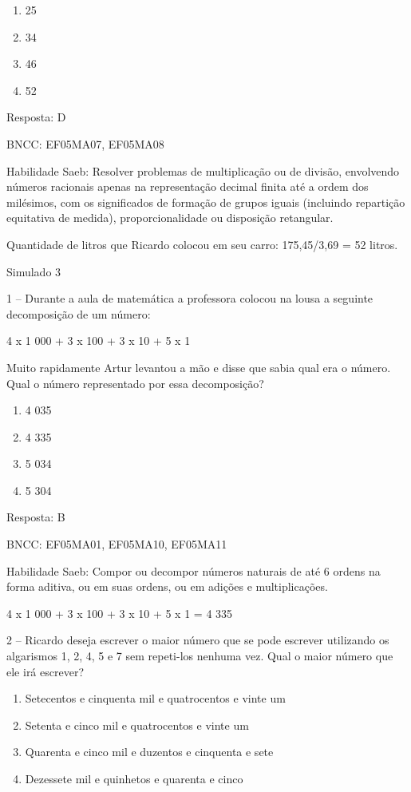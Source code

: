 \begin{enumerate}
\def\labelenumi{\alph{enumi})}
\item
  25
\item
  34
\item
  46
\item
  52
\end{enumerate}

Resposta: D

BNCC: EF05MA07, EF05MA08

Habilidade Saeb: Resolver problemas de multiplicação ou de divisão,
envolvendo números racionais apenas na representação decimal finita até
a ordem dos milésimos, com os significados de formação de grupos iguais
(incluindo repartição equitativa de medida), proporcionalidade ou
disposição retangular.

Quantidade de litros que Ricardo colocou em seu carro: 175,45/3,69 = 52
litros.

Simulado 3

1 -- Durante a aula de matemática a professora colocou na lousa a
seguinte decomposição de um número:

4 x 1 000 + 3 x 100 + 3 x 10 + 5 x 1

Muito rapidamente Artur levantou a mão e disse que sabia qual era o
número. Qual o número representado por essa decomposição?

\begin{enumerate}
\def\labelenumi{\alph{enumi})}
\item
  4 035
\item
  4 335
\item
  5 034
\item
  5 304
\end{enumerate}

Resposta: B

BNCC: EF05MA01, EF05MA10, EF05MA11

Habilidade Saeb: Compor ou decompor números naturais de até 6 ordens na
forma aditiva, ou em suas ordens, ou em adições e multiplicações.

4 x 1 000 + 3 x 100 + 3 x 10 + 5 x 1 = 4 335

2 -- Ricardo deseja escrever o maior número que se pode escrever
utilizando os algarismos 1, 2, 4, 5 e 7 sem repeti-los nenhuma vez. Qual
o maior número que ele irá escrever?

\begin{enumerate}
\def\labelenumi{\alph{enumi})}
\item
  Setecentos e cinquenta mil e quatrocentos e vinte um
\item
  Setenta e cinco mil e quatrocentos e vinte um
\item
  Quarenta e cinco mil e duzentos e cinquenta e sete
\item
  Dezessete mil e quinhetos e quarenta e cinco
\end{enumerate}

